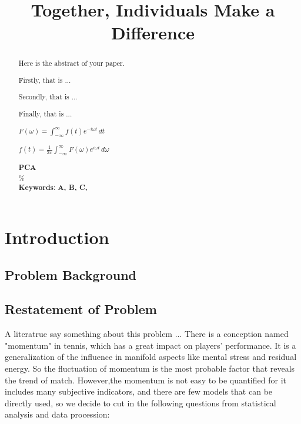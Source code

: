 \documentclass[12pt]{article}  %
\title{Together, Individuals Make a Difference}  %
\begin{document}
\begin{abstract}
    Here is the abstract of your paper.

    Firstly, that is ...

    Secondly, that is ...

    Finally, that is ...

$F(\omega) = \int_{-\infty}^{\infty} f(t) e^{-i \omega t} \, dt$


$f(t) = \frac{1}{2\pi} \int_{-\infty}^{\infty} F(\omega) e^{i \omega t} \, d\omega$

    
    
    \textbf{PCA}\\
    \%\\
    \vspace{5pt}
    \textbf{Keywords}: \textbf{ A, B, C,  }
    
	
\end{abstract}

\maketitle  %
\tableofcontents  %


\section{Introduction}
\subsection{Problem Background}


\subsection{Restatement of Problem}
A literatrue\cite{1} say something about this problem ...
There is a conception named "momentum" in tennis, which has a great impact on players' performance. It is a generalization of the influence in manifold aspects like mental stress and residual energy. So the fluctuation of momentum is the most probable factor that reveals the trend of match. However,the momentum is not easy to be quantified for it includes many subjective indicators, and there are few models that can be directly used, so we decide to cut in the following questions from statistical analysis and data procession:
\end{document}
